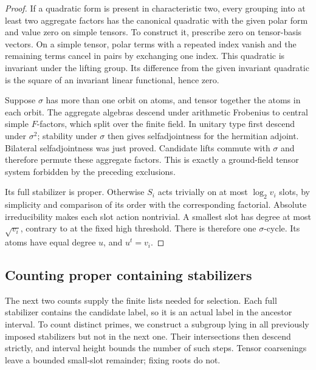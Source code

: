 \begin{proof}
If a quadratic form is present in characteristic two, every grouping
into at least two aggregate factors has the canonical quadratic with
the given polar form and value zero on simple tensors. To construct it,
prescribe zero on tensor-basis vectors. On a simple tensor, polar terms
with a repeated index vanish and the remaining terms cancel in pairs
by exchanging one index. This quadratic is invariant under the lifting
group. Its difference from the given invariant quadratic is the square
of an invariant linear functional, hence zero.

Suppose $\sigma$ has more than one orbit on atoms, and tensor together
the atoms in each orbit. The aggregate algebras descend under arithmetic
Frobenius to central simple $F$-factors, which split over the finite
field. In unitary type first descend under $\sigma^2$; stability under
$\sigma$ then gives selfadjointness for the hermitian adjoint. Bilateral
selfadjointness was just proved. Candidate lifts commute with $\sigma$
and therefore permute these aggregate factors. This is exactly a
ground-field tensor system forbidden by the preceding exclusions.

Its full stabilizer is proper. Otherwise $S_i$ acts trivially on at most
$\log_2v_i$ slots, by simplicity and comparison of its order with the
corresponding factorial. Absolute irreducibility makes each slot action
nontrivial. A smallest slot has degree at most $\sqrt{v_i}$, contrary to
 at the fixed high threshold. There is therefore one
$\sigma$-cycle. Its atoms have equal degree $u$, and $u^t=v_i$.
\end{proof}

\subsection{Counting proper containing stabilizers}

The next two counts supply the finite lists needed for selection. Each
full stabilizer contains the candidate label, so it is an actual label
in the ancestor interval. To count distinct primes, we construct a
subgroup lying in all previously imposed stabilizers but not in the
next one. Their intersections then descend strictly, and interval
height bounds the number of such steps. Tensor coarsenings leave a
bounded small-slot remainder; fixing roots do not.

